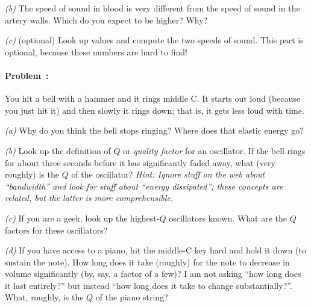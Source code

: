 \documentclass[12pt]{article}
\newcounter{problem}
\begin{document}
\textsl{(b)} The speed of sound in blood is very different from the
speed of sound in the artery walls.  Which do you expect to be higher?
Why?

\textsl{(c)} (optional) Look up values and compute the two speeds of
sound.  This part is optional, because these numbers are hard to find!

\paragraph{Problem~\theproblem:}%
You hit a bell with a hammer and it rings middle C.  It starts out
loud (because you just hit it) and then slowly it rings down; that is,
it gets less loud with time.

\textsl{(a)} Why do you think the bell stops ringing?  Where does that
elastic energy go?

\textsl{(b)} Look up the definition of $Q$ or \emph{quality factor}
for an oscillator.  If the bell rings for about three seconds before
it has significantly faded away, what (very roughly) is the $Q$ of the
oscillator?  \emph{Hint: Ignore stuff on the web about ``bandwidth''
  and look for stuff about ``energy dissipated''; these concepts are
  related, but the latter is more comprehensible.}

\textsl{(c)} If you are a geek, look up the highest-$Q$ oscillators
known.  What are the $Q$ factors for these oscillators?

\textsl{(d)} If you have access to a piano, hit the middle-C key hard
and hold it down (to sustain the note).  How long does it take
(roughly) for the note to decrease in volume significantly (by, say, a
factor of a few)?  I am not asking ``how long does it last entirely?''
but instead ``how long does it take to change substantially?''.  What,
roughly, is the $Q$ of the piano string?
\end{document}
